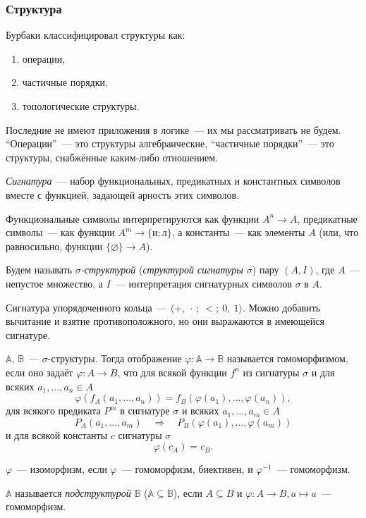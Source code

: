 \subsubsection{Структура}

Бурбаки классифицировал структуры как:
\begin{enumerate}[itemsep=-1.4mm]
	\item операции,
	\item частичные порядки,
	\item топологические структуры.
\end{enumerate}

Последние не имеют приложения в логике~— их мы рассматривать не будем. “Операции”~— это структуры алгебраические, “частичные порядки”~— это структуры, снабжённые каким-либо отношением.

\begin{definition}
	\emph{Сигнатура}~— набор функциональных, предикатных и константных символов вместе с функцией, задающей арность этих символов.

	Функциональные символы интерпретируются как функции $A^n \to A$, предикатные символы~— как функции $A^m \to \{\text{и}; \text{л}\}$, а константы~— как элементы $A$ (или, что равносильно, функции $\{\varnothing\} \to A$).

	Будем называть \emph{$\sigma$-структурой} (\emph{структурой сигнатуры $\sigma$}) пару $(A, I)$, где $A$~— непустое множество, а $I$~— интерпретация сигнатурных символов $\sigma$ в $A$.
\end{definition}

\begin{exmpl}
	Сигнатура упорядоченного кольца~— $\langle {+},\ {\cdot}\,;\ {<};\ 0,\ 1 \rangle$. Можно добавить вычитание и взятие противоположного, но они выражаются в имеющейся сигнатуре.
\end{exmpl}

\begin{definition}
	$\mathbb{A}$, $\mathbb{B}$~— $\sigma$-структуры. Тогда отображение $\varphi: \mathbb{A} \to \mathbb{B}$ называется гомоморфизмом, если оно задаёт $\varphi: A \to B$, что для всякой функции $f^n$ из сигнатуры $\sigma$ и для всяких $a_1, \dots, a_n \in A$
	\[\varphi(f_A(a_1, \dots, a_n)) = f_B(\varphi(a_1), \dots, \varphi(a_n)),\]
	для всякого предиката $P^m$ в сигнатуре $\sigma$ и всяких $a_1, \dots, a_m \in A$
	\[P_A(a_1, \dots, a_m) \quad \Longrightarrow \quad P_B(\varphi(a_1), \dots, \varphi(a_m))\]
	и для всякой константы $c$ сигнатуры $\sigma$
	\[\varphi(c_A) = c_B.\]

	$\varphi$~— изоморфизм, если $\varphi$~— гомоморфизм, биективен, и $\varphi^{-1}$~— гомоморфизм.

	$\mathbb{A}$ называется \emph{подструктурой} $\mathbb{B}$ ($\mathbb{A} \subseteq \mathbb{B}$), если $A \subseteq B$ и $\varphi: A \to B, a \mapsto a$~— гомоморфизм.
\end{definition}

